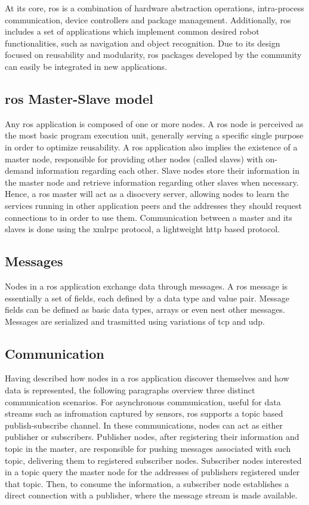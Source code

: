 \documentclass[11pt,twoside,a4paper]{report}
\begin{document}
At its core, \ac{ros} is a combination of hardware abstraction operations, intra-process communication, device controllers and package management. Additionally, \ac{ros} includes a set of applications which implement common desired robot functionalities, such as navigation and object recognition. Due to its design focused on reusability and modularity, \ac{ros} packages developed by the community can easily be integrated in new applications.    

\subsection{\ac{ros} Master-Slave model}

Any \ac{ros} application is composed of one or more nodes. A \ac{ros} node is perceived as the most basic program execution unit, generally serving a specific single purpose in order to optimize reusability. A \ac{ros} application also implies the existence of a master node, responsible for providing other nodes (called slaves) with on-demand information regarding each other. Slave nodes store their information in the master node and retrieve information regarding other slaves when necessary. Hence, a \ac{ros} master will act as a disocvery server, allowing nodes to learn the services running in other application peers and the addresses they should request connections to in order to use them. Communication between a master and its slaves is done using the \ac{xmlrpc} protocol, a lightweight \ac{http} based protocol.       

\subsection{Messages}

Nodes in a \ac{ros} application exchange data through messages. A \ac{ros} message is essentially a set of fields, each defined by a data type and value pair. Message fields can be defined as basic data types, arrays or even nest other messages. Messages are serialized and trasmitted using variations of \ac{tcp} and \ac{udp}. 

\subsection{Communication}

Having described how nodes in a \ac{ros} application discover themselves and how data is represented, the following paragraphs overview three distinct communication scenarios. For asynchronous communication, useful for data streams such as infromation captured by sensors, \ac{ros} supports a topic based publish-subscribe channel. In these communications, nodes can act as either publisher or subscribers. Publisher nodes, after registering their information and topic in the master, are responsible for pushing messages associated with such topic, delivering them to registered subscriber nodes. Subscriber nodes interested in a topic query the master node for the addresses of publishers registered under that topic. Then, to consume the information, a subscriber node establishes a direct connection with a publisher, where the message stream is made available.
\end{document}
